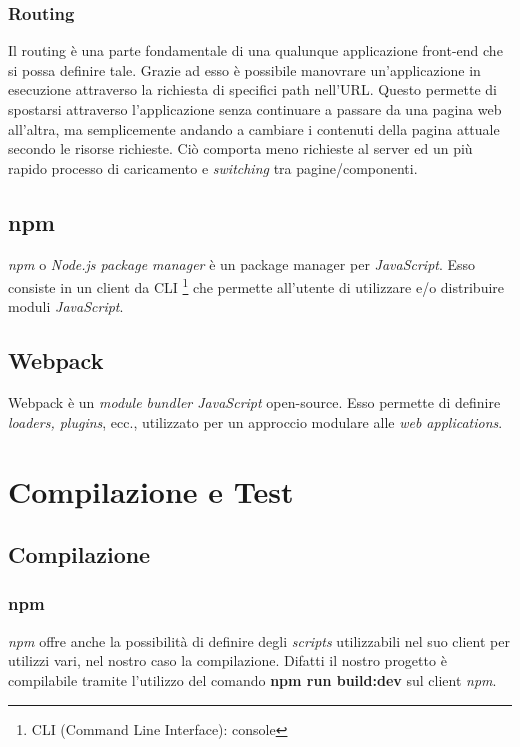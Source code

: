 \documentclass[twoside]{supsistudent}
\begin{document}
\subsubsection{Routing}

Il routing è una parte fondamentale di una qualunque applicazione front-end
che si possa definire tale. Grazie ad esso è possibile manovrare 
un’applicazione in esecuzione attraverso la richiesta di specifici path
nell’URL. Questo permette di spostarsi attraverso l'applicazione senza 
continuare a passare da una pagina web all'altra, ma semplicemente andando a
cambiare i contenuti della pagina attuale secondo le risorse richieste. Ciò 
comporta meno richieste al server ed un più rapido processo di caricamento
e \textit{switching} tra pagine/componenti.

\subsection{npm}

\textit{npm} o \textit{Node.js package manager} è un package manager per 
\textit{JavaScript}. Esso consiste in un client da CLI 
\footnote{CLI (Command Line Interface): console}
che permette all'utente di utilizzare e/o distribuire moduli 
\textit{JavaScript}.

\subsection{Webpack}

Webpack è un \textit{module bundler JavaScript} open-source. Esso permette di 
definire \textit{loaders, plugins}, ecc., utilizzato per un approccio modulare
alle \textit{web applications}.

\section{Compilazione e Test}

\subsection{Compilazione}

\subsubsection{npm}

\textit{npm} offre anche la possibilità di definire degli \textit{scripts}
utilizzabili nel suo client per utilizzi vari, nel nostro caso la compilazione.
Difatti il nostro progetto è compilabile tramite l'utilizzo del comando
\textbf{npm run build:dev} sul client \textit{npm}.
\end{document}
